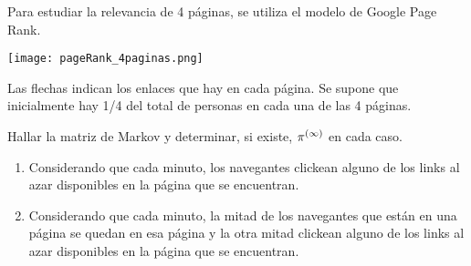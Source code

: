 \begin{ejercicio}
Para estudiar la relevancia de 4 páginas, se utiliza el modelo de Google Page Rank.

\begin{center}
\texttt{[image: pageRank\_4paginas.png]}
\end{center}

Las flechas indican los enlaces que hay en cada página.
Se supone que inicialmente hay 1/4 del total de personas en cada una de las 4 páginas.

Hallar la matriz de Markov y determinar, si existe, $\pib^{(\infty)}$ en cada caso.
\begin{enumerate}
\item Considerando que cada minuto, los navegantes clickean alguno de los links al azar disponibles en la página que se encuentran.
\item Considerando que cada minuto, la mitad de los  navegantes que están en una página se quedan en esa página y la otra mitad clickean alguno de los links al azar disponibles en la página que se encuentran.
\end{enumerate}

\end{ejercicio}
